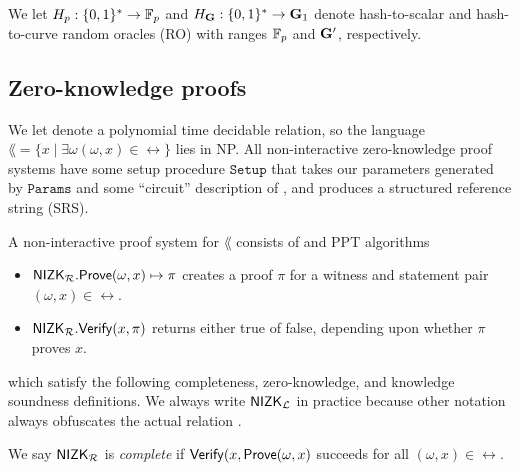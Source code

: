 We let $H_p : \{0,1\}^* \to \mathbb{F}_p$ and $H_{{\mathbf{G}}} : \{0,1\}^* \to {\mathbf{G}}_1$
denote hash-to-scalar and hash-to-curve random oracles (RO) with ranges
$\mathbb{F}_p$ and ${\mathbf{G}}'$, respectively.  


\subsection{Zero-knowledge proofs}
\label{subsec:zkp_background}

% 

We let \rel denote a polynomial time decidable relation, so the language
$\lang = \{x \mid \exists \omega (\omega,x) \in \rel \}$ lies in NP.
All non-interactive zero-knowledge proof systems have some setup procedure $\mathtt{Setup}$ that takes our parameters generated by $\mathtt{Params}$ and some ``circuit'' description of \lang, and produces a structured reference string (SRS).

A non-interactive proof system for $\lang$ consists of \Prove and \Verify PPT algorithms
\begin{itemize}
\item ${\mathsf{NIZK}}_\mathcal{R}.{\mathsf{Prove}}(\omega, x) \mapsto \pi$ creates a proof $\pi$ for a witness and statement pair $(\omega,x) \in \rel$.
\item ${\mathsf{NIZK}}_\mathcal{R}.{\mathsf{Verify}}(x, \pi)$ returns either true of false, depending upon whether $\pi$  proves $x$.
\end{itemize}	
which satisfy the following completeness, zero-knowledge, and knowledge soundness definitions.
We always write ${\mathsf{NIZK}}_\mathcal{L}$ in practice because other notation always obfuscates the actual relation \rel.

\begin{definition}\label{def:nizk_completeness}
We say ${\mathsf{NIZK}}_\mathcal{R}$ is {\em complete} if ${\mathsf{Verify}}(x, {\mathsf{Prove}}(\omega,x)$ succeeds for all $(\omega,x) \in \rel$.  %
\end{definition}

\def\advV{\ensuremath{V^*}\xspace} %

